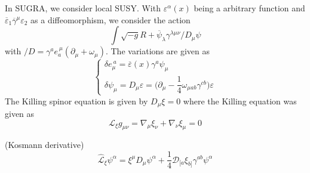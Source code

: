 \vspace{2ex}
\begin{defi}
In SUGRA, we consider local SUSY. With $\varepsilon^{\alpha } (x)$ being a arbitrary function and $\overline{\varepsilon }_{1}\overline{\gamma }^{\mu }\varepsilon _{2}$ as a diffeomorphism, we consider the action
\[\int \sqrt{-g}R+\overline{\psi }_{\lambda }\gamma ^{\lambda \mu \nu }\slash{D}_{\mu }\psi \]
with $\slash{D}=\gamma ^{a}e_{a}^{\ \mu }(\partial _{\mu }+\omega _{\mu })$. The variations are given as
\[\begin{cases}
\delta e_{\mu }^{\ a}=\overline{\varepsilon }(x)\gamma ^{a}\psi _{\mu }\\
\delta \psi _{\mu }=D_{\mu }\varepsilon =\Big(\partial _{\mu }-\dfrac{1}{4}\omega _{\mu ab}\gamma ^{c b}\Big)\varepsilon 
\end{cases}\]
The Killing spinor equation is given by $D_{\mu }\xi =0$ where the Killing equation was given as
\[\mathcal{L}_{\xi }g_{\mu \nu }=\nabla _{\mu }\xi _{\nu }+\nabla _{\nu }\xi _{\mu }=0\]
\end{defi}
\vspace{2ex}
\begin{defi}
(Kosmann derivative) 
\[\hat{\mathcal{L}}_{\xi }\psi ^{\alpha }=\xi ^{\mu }D_{\mu }\psi ^{\alpha }+\dfrac{1}{4}\mathcal{D}_{[a}\xi _{b]}\gamma ^{ab}\psi ^{\alpha }\]
\end{defi}
\vspace{2ex}

